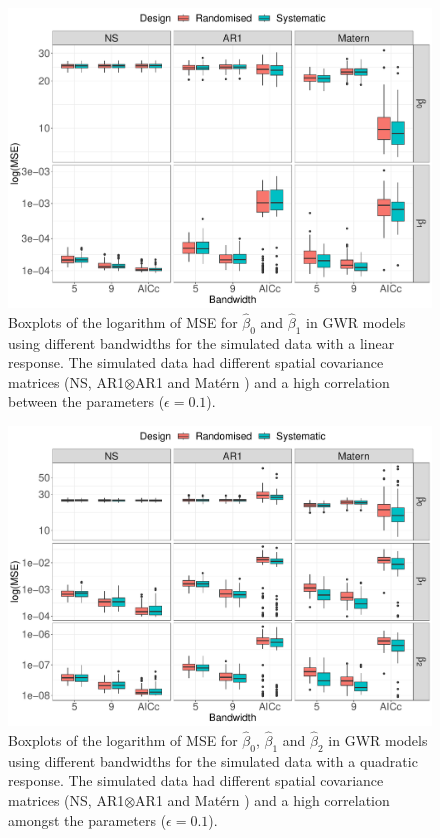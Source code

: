 \documentclass[a4paper]{article} 	%
\newcommand{\Matern}{Mat\'ern }
\begin{document}
\begin{figure}[H]
	\centering
	\includegraphics[width=\linewidth]{Expt/Col_LinCombMSE_newpar_eta01.pdf}
	\caption{Boxplots of the logarithm of MSE for $\hat{\beta}_0$ and $\hat{\beta}_1$ in GWR models using different bandwidths for the simulated data with a linear response. The simulated data had different spatial covariance matrices (NS, AR1$\otimes$AR1 and \Matern) and a high correlation between the parameters ($\epsilon=0.1$).}\label{fig:LinBetaMSEeta01}
\end{figure}


\begin{figure}[H]
	\centering
	\includegraphics[width=\linewidth]{Expt/Col_QuaCombMSE_newpar_eta01.pdf}
	\caption{Boxplots of the logarithm of MSE for $\hat{\beta}_0$, $\hat{\beta}_1$ and $\hat{\beta}_2$ in GWR models using different bandwidths for the simulated data with a quadratic response. The simulated data had different spatial covariance matrices (NS, AR1$\otimes$AR1 and \Matern) and a high correlation amongst the parameters ($\epsilon=0.1$).} \label{fig:QuadBetaMSEeta01}
\end{figure}





\renewcommand\bibname{References}%
\printbibliography
\end{document}
